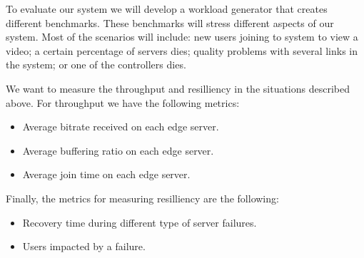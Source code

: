 To evaluate our system we will develop a workload generator that creates different benchmarks. These benchmarks will stress different aspects of our system. Most of the scenarios will include: new users joining to system to view a video; a certain percentage of servers dies; quality problems with several links in the system; or one of the controllers dies.

We want to measure the throughput and resilliency in the situations described above. For throughput we have the following metrics:

\begin{itemize}
\item Average bitrate received on each edge server.
\item Average buffering ratio on each edge server.
\item Average join time on each edge server.
\end{itemize}

Finally, the metrics for measuring resilliency are the following:

\begin{itemize}
\item Recovery time during different type of server failures.
\item Users impacted by a failure.
\end{itemize}
